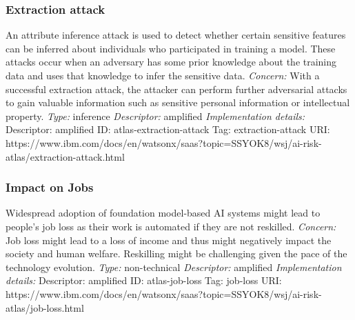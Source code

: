 \documentclass{article}
\begin{document}
\subsubsection*{Extraction attack}
An attribute inference attack is used to detect whether certain sensitive features can be inferred about individuals who participated in training a model. These attacks occur when an adversary has some prior knowledge about the training data and uses that knowledge to infer the sensitive data.\newline
\textit{Concern: }With a successful extraction attack, the attacker can perform further adversarial attacks to gain valuable information such as sensitive personal information or intellectual property.\newline\newline
\textit{Type: }inference\newline
\textit{Descriptor: }amplified \newline\newline
\textit{Implementation details:} \newline
Descriptor: amplified \newline
ID: atlas-extraction-attack \newline
Tag: extraction-attack \newline
URI:  https://www.ibm.com/docs/en/watsonx/saas?topic=SSYOK8/wsj/ai-risk-atlas/extraction-attack.html\newline
\subsubsection*{Impact on Jobs}
Widespread adoption of foundation model-based AI systems might lead to people's job loss as their work is automated if they are not reskilled.\newline
\textit{Concern: }Job loss might lead to a loss of income and thus might negatively impact the society and human welfare. Reskilling might be challenging given the pace of the technology evolution.\newline\newline
\textit{Type: }non-technical\newline
\textit{Descriptor: }amplified \newline\newline
\textit{Implementation details:} \newline
Descriptor: amplified \newline
ID: atlas-job-loss \newline
Tag: job-loss \newline
URI:  https://www.ibm.com/docs/en/watsonx/saas?topic=SSYOK8/wsj/ai-risk-atlas/job-loss.html\newline
\end{document}
